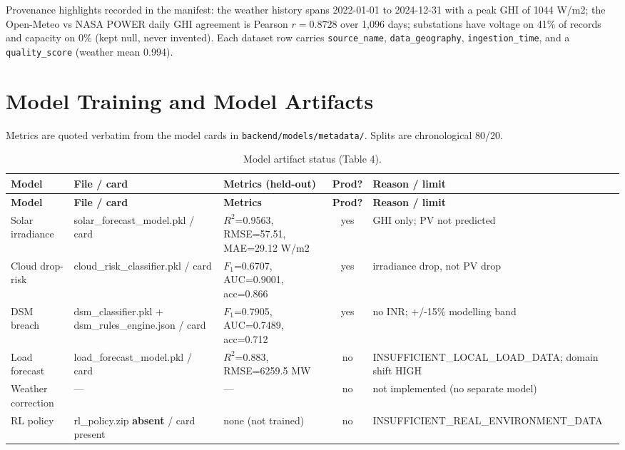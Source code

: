 \documentclass[11pt,a4paper]{article}
\newcommand{\yes}{\textcolor{cok}{yes}}
\newcommand{\no}{\textcolor{cmiss}{no}}
\newcommand{\code}[1]{\texttt{\small #1}}
\begin{document}
\noindent Provenance highlights recorded in the manifest: the weather history spans
2022-01-01 to 2024-12-31 with a peak GHI of 1044 W/m2; the Open-Meteo vs NASA POWER daily
GHI agreement is Pearson $r=0.8728$ over 1{,}096 days; substations have voltage on 41\%
of records and capacity on 0\% (kept null, never invented). Each dataset row carries
\code{source\_name}, \code{data\_geography}, \code{ingestion\_time}, and a
\code{quality\_score} (weather mean 0.994).

\section{Model Training and Model Artifacts}
Metrics are quoted verbatim from the model cards in \code{backend/models/metadata/}.
Splits are chronological 80/20.

\begin{footnotesize}
\begin{longtable}{@{}p{2.4cm}p{2.6cm}p{3.3cm}c p{2.4cm}@{}}
\caption{Model artifact status (Table 4).}\label{tab:models}\\
\toprule
\textbf{Model} & \textbf{File / card} & \textbf{Metrics (held-out)} & \textbf{Prod?} & \textbf{Reason / limit}\\
\midrule
\endfirsthead
\toprule
\textbf{Model} & \textbf{File / card} & \textbf{Metrics} & \textbf{Prod?} & \textbf{Reason / limit}\\
\midrule
\endhead
\bottomrule
\endfoot
Solar irradiance & solar\_forecast\_model.pkl / card & $R^2$=0.9563, RMSE=57.51, MAE=29.12 W/m2 & \yes & GHI only; PV not predicted\\
Cloud drop-risk & cloud\_risk\_classifier.pkl / card & $F_1$=0.6707, AUC=0.9001, acc=0.866 & \yes & irradiance drop, not PV drop\\
DSM breach & dsm\_classifier.pkl + dsm\_rules\_engine.json / card & $F_1$=0.7905, AUC=0.7489, acc=0.712 & \yes & no INR; +/-15\% modelling band\\
Load forecast & load\_forecast\_model.pkl / card & $R^2$=0.883, RMSE=6259.5 MW & \no & INSUFFICIENT\_LOCAL\_LOAD\_DATA; domain shift HIGH\\
Weather correction & --- & --- & \no & not implemented (no separate model)\\
RL policy & rl\_policy.zip \textbf{absent} / card present & none (not trained) & \no & INSUFFICIENT\_REAL\_ENVIRONMENT\_DATA\\
\bottomrule
\end{longtable}
\end{footnotesize}
\end{document}
